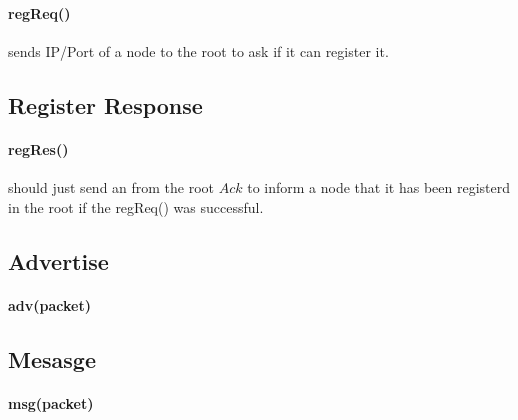 \documentclass{article}
\begin{document}
\paragraph{regReq()} sends IP/Port of a node to the root to ask if it can register it. 
\subsection{Register Response}
\paragraph{regRes()} should just send an from the root $Ack$ to inform a node that it has been registerd in the root if the regReq() was successful.
\subsection{Advertise}
\paragraph{adv(packet)}
\subsection{Mesasge}
\paragraph{msg(packet)}
\clearpage
\end{document}
